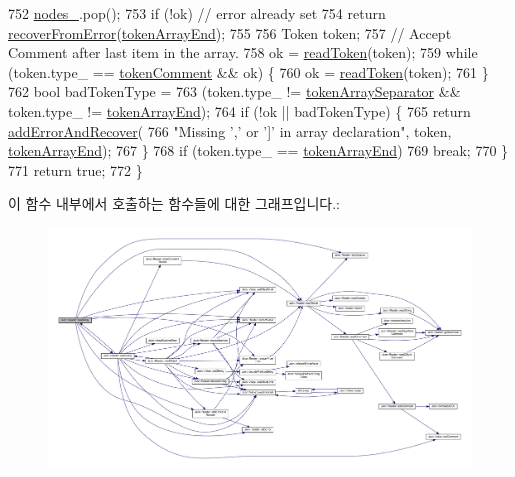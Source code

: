 \begin{DoxyCode}
752     \hyperlink{class_json_1_1_reader_ada3d2c47699dad662e6d156c8c78a6ac}{nodes\_}.pop();
753     \textcolor{keywordflow}{if} (!ok) \textcolor{comment}{// error already set}
754       \textcolor{keywordflow}{return} \hyperlink{class_json_1_1_reader_a8d4ed03a43082c5ace81ba5b81425eaf}{recoverFromError}(\hyperlink{class_json_1_1_reader_aa35e6ab574dc399a0a645ad98ed66bc9a9adc87fd67f5fc21391a4be89382a316}{tokenArrayEnd});
755 
756     Token token;
757     \textcolor{comment}{// Accept Comment after last item in the array.}
758     ok = \hyperlink{class_json_1_1_reader_a7cb0631963cc0fd4ff6ed0f570976864}{readToken}(token);
759     \textcolor{keywordflow}{while} (token.type\_ == \hyperlink{class_json_1_1_reader_aa35e6ab574dc399a0a645ad98ed66bc9ae4fcf05c3b1ce462bacd34af0ccac32b}{tokenComment} && ok) \{
760       ok = \hyperlink{class_json_1_1_reader_a7cb0631963cc0fd4ff6ed0f570976864}{readToken}(token);
761     \}
762     \textcolor{keywordtype}{bool} badTokenType =
763         (token.type\_ != \hyperlink{class_json_1_1_reader_aa35e6ab574dc399a0a645ad98ed66bc9af2c235e8da86f11ffb1a1243e49ed1fa}{tokenArraySeparator} && token.type\_ != 
      \hyperlink{class_json_1_1_reader_aa35e6ab574dc399a0a645ad98ed66bc9a9adc87fd67f5fc21391a4be89382a316}{tokenArrayEnd});
764     \textcolor{keywordflow}{if} (!ok || badTokenType) \{
765       \textcolor{keywordflow}{return} \hyperlink{class_json_1_1_reader_a478db8ac6d00db1409608a37b66bc38d}{addErrorAndRecover}(
766           \textcolor{stringliteral}{"Missing ',' or ']' in array declaration"}, token, \hyperlink{class_json_1_1_reader_aa35e6ab574dc399a0a645ad98ed66bc9a9adc87fd67f5fc21391a4be89382a316}{tokenArrayEnd});
767     \}
768     \textcolor{keywordflow}{if} (token.type\_ == \hyperlink{class_json_1_1_reader_aa35e6ab574dc399a0a645ad98ed66bc9a9adc87fd67f5fc21391a4be89382a316}{tokenArrayEnd})
769       \textcolor{keywordflow}{break};
770   \}
771   \textcolor{keywordflow}{return} \textcolor{keyword}{true};
772 \}
\end{DoxyCode}
이 함수 내부에서 호출하는 함수들에 대한 그래프입니다.\+:\nopagebreak
\begin{figure}[H]
\begin{center}
\leavevmode
\includegraphics[width=350pt]{class_json_1_1_reader_afd9a30c0af205c9f327613f486fae6b8_cgraph}
\end{center}
\end{figure}
